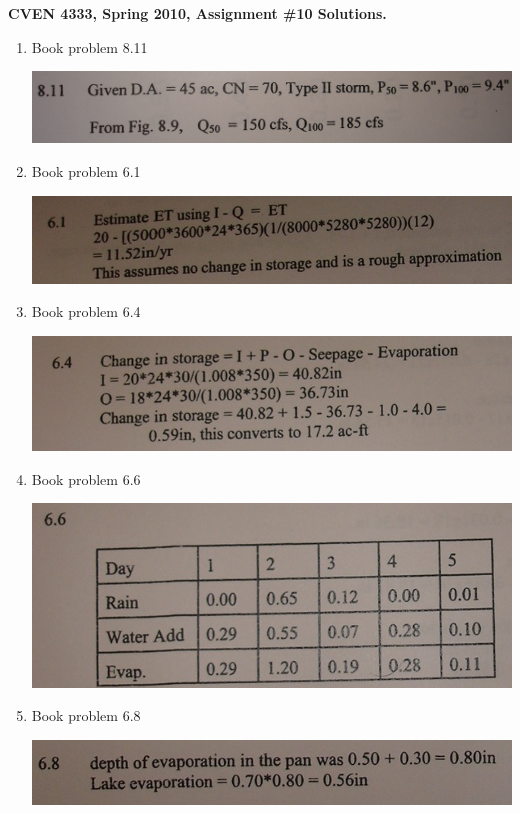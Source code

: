 \documentclass[11pt]{article}
\begin{document}
\textbf{CVEN 4333, Spring 2010, Assignment \#10 Solutions.}

\begin{enumerate}

\item Book problem 8.11

\includegraphics[width=\textwidth]{8-11}

\item Book problem 6.1

\includegraphics[width=\textwidth]{6-1}

\item Book problem 6.4

\includegraphics[width=\textwidth]{6-4}

\item Book problem 6.6

\includegraphics[width=\textwidth]{6-6}

\item Book problem 6.8

\includegraphics[width=\textwidth]{6-8}


\end{enumerate}
\end{document}
